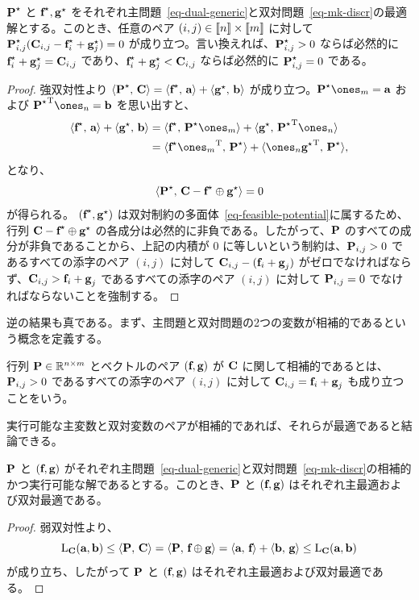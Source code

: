 \begin{prop}\label{prop-primal-dual-optimal} $\P^\star$ と $\fD^\star,\gD^\star$ をそれぞれ主問題~\eqref{eq-dual-generic}と双対問題~\eqref{eq-mk-discr}の最適解とする。このとき、任意のペア $(i,j)\in\range{n}\times\range{m}$ に対して $\P^\star_{i,j}(\C_{i,j}-\fD^\star_i+\gD^\star_j)=0$ が成り立つ。言い換えれば、$\P^\star_{i,j}>0$ ならば必然的に $\fD^\star_i+\gD^\star_j=\C_{i,j}$ であり、$\fD^\star_i+\gD^\star_j<\C_{i,j}$ ならば必然的に $\P^\star_{i,j}=0$ である。
\end{prop}
\begin{proof} 強双対性より $\dotp{\P^\star}{\C} = \dotp{\fD^\star}{\a}+\dotp{\gD^\star}{\b}$ が成り立つ。$\P^\star\ones_m = \a$ および $\transp{\P^\star}\ones_n = \b$ を思い出すと、
	$$\begin{aligned}\dotp{\fD^\star}{\a}+\dotp{\gD^\star}{\b} &= \dotp{\fD^\star}{\P^\star\ones_m}+\dotp{\gD^\star}{\transp{\P^\star}\ones_n}\\&=  \dotp{\fD^\star\transp{\ones_m}}{\P^\star}+\dotp{\ones_n\transp{\gD^\star}}{\P^\star},\end{aligned}$$
	となり、$$\dotp{\P^\star}{\C- \fD^\star\oplus \gD^\star}=0$$ が得られる。
$(\fD^\star,\gD^\star)$ は双対制約の多面体~\eqref{eq-feasible-potential}に属するため、行列 $\C- \fD^\star\oplus \gD^\star$ の各成分は必然的に非負である。したがって、$\P$ のすべての成分が非負であることから、上記の内積が $0$ に等しいという制約は、$\P_{i,j}>0$ であるすべての添字のペア $(i,j)$ に対して $\C_{i,j}-(\fD_i+\gD_j)$ がゼロでなければならず、$\C_{i,j}>\fD_i+\gD_j$ であるすべての添字のペア $(i,j)$ に対して $\P_{i,j}=0$ でなければならないことを強制する。
\end{proof}

逆の結果も真である。まず、主問題と双対問題の2つの変数が相補的であるという概念を定義する。

\begin{defn}\label{def-complementary}
行列 $\P\in\RR^{n\times m}$ とベクトルのペア $(\fD,\gD)$ が $\C$ に関して相補的であるとは、$\P_{i,j}>0$ であるすべての添字のペア $(i,j)$ に対して $\C_{i,j}=\fD_i+\gD_j$ も成り立つことをいう。
\end{defn}

実行可能な主変数と双対変数のペアが相補的であれば、それらが最適であると結論できる。

\begin{prop}\label{prop-primal-dual-optimality} $\P$ と $(\fD,\gD)$ がそれぞれ主問題~\eqref{eq-dual-generic}と双対問題~\eqref{eq-mk-discr}の相補的かつ実行可能な解であるとする。このとき、$\P$ と $(\fD,\gD)$ はそれぞれ主最適および双対最適である。
\end{prop}
\begin{proof}
	弱双対性より、
$$\MKD_{\C}(\a,\b)\leq \dotp{\P}{\C}=\dotp{\P}{\fD\oplus\gD}=\dotp{\a}{\fD}+\dotp{\b}{\gD}\leq \MKD_{\C}(\a,\b)$$
が成り立ち、したがって $\P$ と $(\fD,\gD)$ はそれぞれ主最適および双対最適である。
\end{proof}


